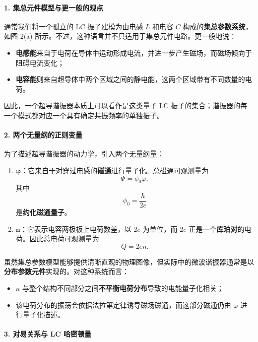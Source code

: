\documentclass[12pt,a4paper,oneside]{ctexbook}
\begin{document}
\paragraph{1. 集总元件模型与更一般的观点}

通常我们将一个孤立的 LC 振子建模为由电感 \(L\) 和电容 \(C\) 构成的\textbf{集总参数系统}，如图 2(a) 所示。不过，这种语言并不只适用于集总元件电路。更一般地说：

\begin{itemize}[leftmargin=2em]
    \item \textbf{电感能}来自于电荷在导体中运动形成电流，并进一步产生磁场，而磁场倾向于阻碍电流变化；
    \item \textbf{电容能}则来自超导体中两个区域之间的静电能，这两个区域带有不同数量的电荷。
\end{itemize}

因此，一个超导谐振器本质上可以看作是这类量子 LC 振子的集合；谐振器的每一个模式都对应一个具有确定共振频率的单独振子。

\paragraph{2. 两个无量纲的正则变量}

为了描述超导谐振器的动力学，引入两个无量纲量：

\begin{enumerate}[leftmargin=2em]
    \item \(\bm{\varphi}\)：它来自于对穿过电感的\textbf{磁通}进行量子化。总磁通可观测量为
    \[
        \Phi=\phi_0 \varphi,
    \]
    其中
    \[
        \phi_0=\frac{\hbar}{2e}
    \]
    是\textbf{约化磁通量子}。

    \item \(\bm{n}\)：它表示电容两极板上电荷数差，以 \(2e\) 为单位，而 \(2e\) 正是一个\textbf{库珀对}的电荷。因此总电荷可观测量为
    \[
        Q=2en.
    \]
\end{enumerate}

虽然集总参数模型能够提供清晰直观的物理图像，但实际中的微波谐振器通常是以\textbf{分布参数元件}实现的。对这种系统而言：
\begin{itemize}[leftmargin=2em]
    \item \(n\) 与整个结构不同部分之间\textbf{不平衡电荷分布}导致的电能量子化相关；
    \item 该电荷分布的振荡会依据法拉第定律诱导磁场磁通，而这部分磁通仍由 \(\varphi\) 进行量子化描述。
\end{itemize}

\paragraph{3. 对易关系与 LC 哈密顿量}
\end{document}
